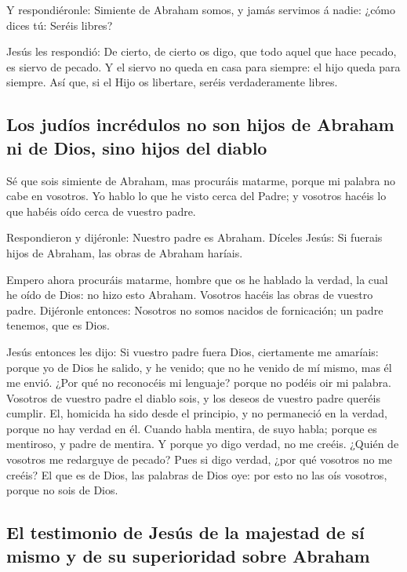  Y respondiéronle: Simiente de Abraham somos, y jamás
servimos á nadie: ¿cómo dices tú: Seréis libres?

 Jesús les respondió: De cierto, de cierto os digo, que
todo aquel que hace pecado, es siervo de pecado.  Y el
siervo no queda en casa para siempre: el hijo queda para siempre.
 Así que, si el Hijo os libertare, seréis verdaderamente
libres.

\hypertarget{los-juduxedos-incruxe9dulos-no-son-hijos-de-abraham-ni-de-dios-sino-hijos-del-diablo}{%
\subsection{Los judíos incrédulos no son hijos de Abraham ni de Dios,
sino hijos del
diablo}\label{los-juduxedos-incruxe9dulos-no-son-hijos-de-abraham-ni-de-dios-sino-hijos-del-diablo}}

 Sé que sois simiente de Abraham, mas procuráis matarme,
porque mi palabra no cabe en vosotros.  Yo hablo lo que he
visto cerca del Padre; y vosotros hacéis lo que habéis oído cerca de
vuestro padre.

 Respondieron y dijéronle: Nuestro padre es Abraham.
Díceles Jesús: Si fuerais hijos de Abraham, las obras de Abraham
haríais.

 Empero ahora procuráis matarme, hombre que os he hablado
la verdad, la cual he oído de Dios: no hizo esto Abraham. 
Vosotros hacéis las obras de vuestro padre. Dijéronle entonces: Nosotros
no somos nacidos de fornicación; un padre tenemos, que es Dios.

 Jesús entonces les dijo: Si vuestro padre fuera Dios,
ciertamente me amaríais: porque yo de Dios he salido, y he venido; que
no he venido de mí mismo, mas él me envió.  ¿Por qué no
reconocéis mi lenguaje? porque no podéis oir mi palabra. 
Vosotros de vuestro padre el diablo sois, y los deseos de vuestro padre
queréis cumplir. El, homicida ha sido desde el principio, y no
permaneció en la verdad, porque no hay verdad en él. Cuando habla
mentira, de suyo habla; porque es mentiroso, y padre de mentira.
 Y porque yo digo verdad, no me creéis. 
¿Quién de vosotros me redarguye de pecado? Pues si digo verdad, ¿por qué
vosotros no me creéis?  El que es de Dios, las palabras de
Dios oye: por esto no las oís vosotros, porque no sois de Dios.

\hypertarget{el-testimonio-de-jesuxfas-de-la-majestad-de-suxed-mismo-y-de-su-superioridad-sobre-abraham}{%
\subsection{El testimonio de Jesús de la majestad de sí mismo y de su
superioridad sobre
Abraham}\label{el-testimonio-de-jesuxfas-de-la-majestad-de-suxed-mismo-y-de-su-superioridad-sobre-abraham}}

